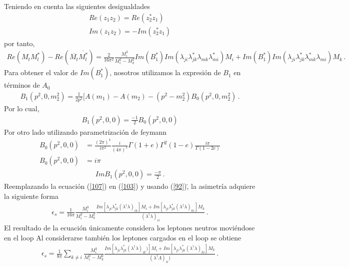 Teniendo en cuenta las siguientes desigualdades 
\begin{align}
Re(z_{1}z_{2})=Re(z_{2}^*z_{1})\\
Im(z_{1}z_{2})=-Im(z_{2}^*z_{1})
\end{align}
 por tanto,
 \begin{align}
 \label{103}
 Re(M_{t}M^*_{l})-Re(\overline{M_{t}}\overline{M^*_{l}})=\frac{2}{16\pi^2}
\frac{M_{i}^3}{M_{i}^2-M_{k}^2}Im(B_{1}^*)Im(\lambda_{ji}\lambda^*_{jk}\lambda_{mk}\lambda^*_{mi})M_{i}+Im(B_{1}^*)Im(\lambda_{ji}\lambda^*_{jk}\lambda^*_{mk}\lambda_{mi})M_{k}\, . 
 \end{align}
 Para obtener el valor de $Im(B_{1}^*)$, nosotros utilizamos la expresión de $B_{1}$ en términos de $A_{0}$~\cite{Ellis:2011cr}
 \begin{align}
 B_{1}(p^2,0,m_{2}^2)=\frac{1}{2p^2}[A(m_{1})-A(m_{2})-(p^2-m_{2}^2)B_{0}(p^2,0,m_{2}^2)\, . 
\end{align}
 Por lo cual,
  \begin{align}
 B_{1}(p^2,0,0)=\frac{-1}{2}B_{0}(p^2,0,0)
 \end{align}
 Por otro lado utilizando parametrización de feymann~\cite{oleari:2017}
 \begin{align}
 B_{0}(p^2,0,0)&=\frac{(2\pi)^4}{i\pi^2}\frac{i}{(4\pi)^2}\Gamma(1+e)\Gamma^2(1-e)\frac{i\pi}{\Gamma(1-2e)}\nonumber \\
  B_{0}(p^2,0,0)&=i\pi
 \end{align}
 \begin{align}
 \label{107}
 ImB_{1}(p^2,0,0)=\frac{-\pi}{2}\, . 
 \end{align}
 Reemplazando la ecuación (\ref{107}) en (\ref{103}) y usando (\ref{92})\. , la asimetría adquiere la siguiente forma
 \begin{align}
 \epsilon_{s}=\frac{1}{16\pi}
\frac{M_{i}^3}{M_{i}^2-M_{k}^2}\frac{Im[\lambda_{ji}\lambda^*_{jk}(\lambda^\dagger\lambda)_{ik}]M_{i}+Im[\lambda_{ji}\lambda^*_{jk}(\lambda^\dagger\lambda)_{ki}]M_{k}}{(\lambda^\dagger\lambda)_{ii}}\, . 
 \end{align}
El resultado de la ecuación únicamente considera los leptones neutros moviéndose en el loop
Al considerarse también los leptones cargados en el loop se obtiene
 \begin{align}
 \label{asi}
 \epsilon_{s}=\frac{1}{8\pi}\sum_{k\not=i}
\frac{M_{i}^3}{M_{i}^2-M_{k}^2}\frac{Im[\lambda_{ji}\lambda^*_{jk}(\lambda^\dagger\lambda)_{ik})]M_{i}+Im[\lambda_{ji}\lambda^*_{jk}(\lambda^\dagger\lambda)_{ki}]M_{k}}{(\lambda^\dagger\Lambda)_{ii})}\, . 
 \end{align}
